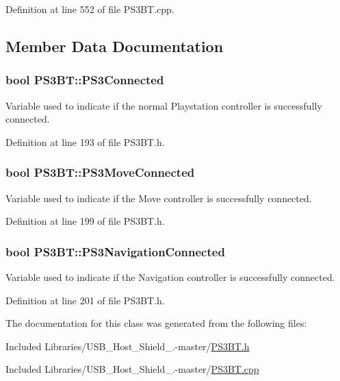 \-Definition at line 552 of file \-P\-S3\-B\-T.\-cpp.



\subsection{\-Member \-Data \-Documentation}
\hypertarget{class_p_s3_b_t_a2804535e3164eafca80a6f6c6bd9a4f9}{
\subsubsection[{\-P\-S3\-Connected}]{\setlength{\rightskip}{0pt plus 5cm}bool {\bf \-P\-S3\-B\-T\-::\-P\-S3\-Connected}}}\label{class_p_s3_b_t_a2804535e3164eafca80a6f6c6bd9a4f9}
\-Variable used to indicate if the normal \-Playstation controller is successfully connected. 

\-Definition at line 193 of file \-P\-S3\-B\-T.\-h.

\hypertarget{class_p_s3_b_t_a9273b6796948b83772117b3805421b4a}{
\subsubsection[{\-P\-S3\-Move\-Connected}]{\setlength{\rightskip}{0pt plus 5cm}bool {\bf \-P\-S3\-B\-T\-::\-P\-S3\-Move\-Connected}}}\label{class_p_s3_b_t_a9273b6796948b83772117b3805421b4a}
\-Variable used to indicate if the \-Move controller is successfully connected. 

\-Definition at line 199 of file \-P\-S3\-B\-T.\-h.

\hypertarget{class_p_s3_b_t_ab35277632083d43f8750d130bea6d430}{
\subsubsection[{\-P\-S3\-Navigation\-Connected}]{\setlength{\rightskip}{0pt plus 5cm}bool {\bf \-P\-S3\-B\-T\-::\-P\-S3\-Navigation\-Connected}}}\label{class_p_s3_b_t_ab35277632083d43f8750d130bea6d430}
\-Variable used to indicate if the \-Navigation controller is successfully connected. 

\-Definition at line 201 of file \-P\-S3\-B\-T.\-h.



\-The documentation for this class was generated from the following files\-:\begin{DoxyCompactItemize}
\item 
\-Included Libraries/\-U\-S\-B\-\_\-\-Host\-\_\-\-Shield\-\_.-\/master/\hyperlink{_p_s3_b_t_8h}{\-P\-S3\-B\-T.\-h}\item 
\-Included Libraries/\-U\-S\-B\-\_\-\-Host\-\_\-\-Shield\-\_.-\/master/\hyperlink{_p_s3_b_t_8cpp}{\-P\-S3\-B\-T.\-cpp}\end{DoxyCompactItemize}
